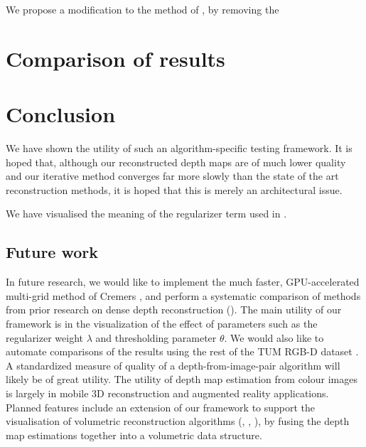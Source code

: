 \documentclass[conference]{IEEEtran}
\begin{document}
We propose a modification to the method of \cite{dense_geometry}, by removing the 









\section{Comparison of results}

\section{Conclusion}
We have shown the utility of such an algorithm-specific testing framework. It is hoped that, although our reconstructed depth maps are of much lower quality
and our iterative method converges far more slowly than the state of the art reconstruction methods, it is hoped that this is merely an architectural issue.

We have visualised the meaning of the regularizer term used in \cite{dense_geometry}.

\subsection{Future work}
In future research, we would like to implement the much faster, GPU-accelerated multi-grid method of Cremers \cite{dense_geometry},
and perform a systematic comparison of methods from prior research on dense depth reconstruction (\cite{things}).
The main utility of our framework is in the visualization of the effect of parameters such as the regularizer weight $\lambda$ and thresholding
parameter $\theta$.
We would also like to automate comparisons of the results using the rest of the TUM RGB-D dataset \cite{tum_dataset}. A standardized measure of quality
of a depth-from-image-pair algorithm will likely be of great utility. The utility of depth map estimation from colour images is largely in
mobile 3D reconstruction and augmented reality applications. Planned features include an extension of our framework to support the visualisation of volumetric reconstruction algorithms (\cite{largescale}, \cite{volumetric}, \cite{kinectfusion}), by fusing the depth map estimations together into a volumetric data structure.
\end{document}

